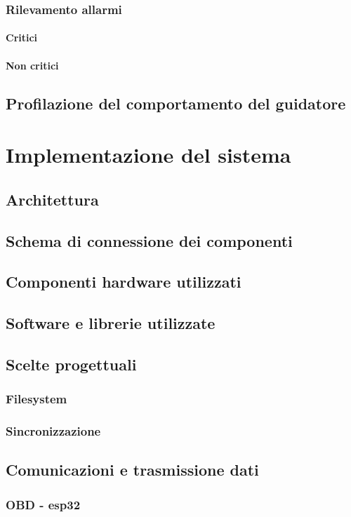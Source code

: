 \documentclass[12pt,a4paper]{report}
\begin{document}
\subsection{Rilevamento allarmi}
\subsubsection{Critici}
\subsubsection{Non critici}
\section{Profilazione del comportamento del guidatore}

\chapter{Implementazione del sistema}
\section{Architettura}
\section{Schema di connessione dei componenti}
\section{Componenti hardware utilizzati}
\section{Software e librerie utilizzate}
\section{Scelte progettuali}
\subsection{Filesystem}
\subsection{Sincronizzazione}
\section{Comunicazioni e trasmissione dati}
\subsection{OBD - esp32}
\end{document}
